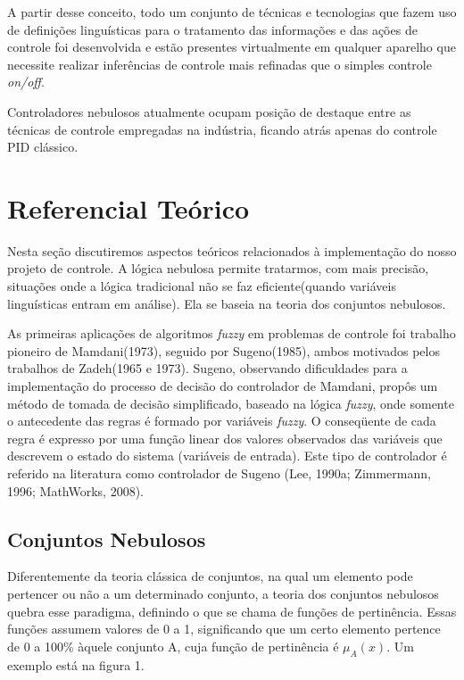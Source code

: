 \documentclass[conference]{IEEEtran}
\begin{document}
A partir desse conceito, todo um conjunto de técnicas e tecnologias que fazem uso de definições linguísticas para o tratamento das informações e das ações de controle foi desenvolvida e estão presentes virtualmente em qualquer aparelho que necessite realizar inferências de controle mais refinadas que o simples controle \textit{on/off}.

Controladores nebulosos atualmente ocupam posição de destaque entre as técnicas de controle empregadas na indústria, ficando atrás apenas do controle PID clássico.

\section{Referencial Teórico}

Nesta seção discutiremos aspectos teóricos relacionados à implementação do nosso projeto de controle. A lógica nebulosa permite tratarmos, com mais precisão, situações onde a lógica tradicional não se faz eficiente(quando variáveis linguísticas entram em análise). Ela se baseia na teoria dos conjuntos nebulosos.

As primeiras aplicações de algoritmos \textit{fuzzy} em problemas de controle foi trabalho pioneiro de Mamdani(1973), seguido por Sugeno(1985), ambos motivados pelos trabalhos de Zadeh(1965 e 1973). Sugeno, observando dificuldades para a implementação do processo de decisão do controlador de Mamdani, propôs um método de tomada de decisão simplificado, baseado na lógica \textit{fuzzy}, onde somente o antecedente das regras é formado por variáveis \textit{fuzzy}. O conseqüente de cada regra é expresso por uma função linear dos valores observados das variáveis que descrevem o estado do sistema (variáveis de entrada). Este tipo de controlador é referido na literatura como controlador de Sugeno (Lee, 1990a; Zimmermann, 1996; MathWorks, 2008).


\subsection{Conjuntos Nebulosos}

Diferentemente da teoria clássica de conjuntos, na qual um elemento pode pertencer ou não a um determinado conjunto, a teoria dos conjuntos nebulosos quebra esse paradigma, definindo o que se chama de funções de pertinência. Essas funções assumem valores de 0 a 1, significando que um certo elemento pertence de 0 a 100\% àquele conjunto A, cuja função de pertinência é $\mu_A(x)$. Um exemplo está na figura 1.
\end{document}
